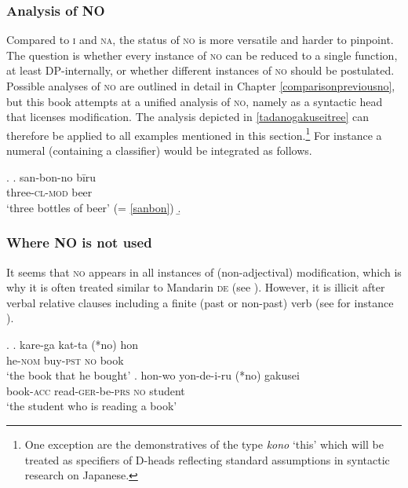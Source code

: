 \documentclass [output=book,colorlinks,citecolor=brown]{langscibook}
\begin{document}
\subsubsection{Analysis of NO}

Compared to \textsc{i} and \textsc{na}, the status of \textsc{no} is more versatile and harder to pinpoint. The question is whether every instance of \textsc{no} can be reduced to a single function, at least DP-internally, or whether different instances of \textsc{no} should be postulated. Possible analyses of \textsc{no} are outlined in detail in Chapter \ref{comparisonpreviousno}, but this book attempts at a unified analysis of \textsc{no}, namely as a syntactic head that licenses modification. The analysis depicted in \ref{tadanogakuseitree} can therefore be applied to all examples mentioned in this section.\footnote{One exception are the demonstratives of the type \textit{kono} `this’ which will be treated as specifiers of D-heads reflecting standard assumptions in syntactic research on Japanese.} For instance a numeral (containing a classifier) would be integrated as follows. %

\ex. \ag. san-bon-no bīru\\
three-\textsc{cl-mod} beer\\
`three bottles of beer’ \null \hfill (= \ref{sanbon})
\b. 

\subsubsection{Where \textsc{NO} is not used} \label{no no}

It seems that \textsc{no} appears in all instances of (non-adjectival) modification, which is why it is often treated similar to Mandarin \textsc{de} (see \citealt{saito:2008:N}). However, it is illicit after verbal relative clauses including a finite (past or non-past) verb (see for instance \citealt{murasugi:1991:noun, saito:2008:N}).

\ex. \ag. kare-ga kat-ta (*no) hon\\
he-\textsc{nom} buy-\textsc{pst} \textsc{no} book\\
`the book that he bought’
\bg. hon-wo yon-de-i-ru (*no) gakusei\\
book-\textsc{acc} read-\textsc{ger}-be-\textsc{prs} \textsc{no} student\\
`the student who is reading a book’
\end{document}
